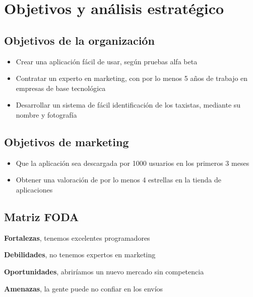\chapter{Objetivos y análisis estratégico}

\section{Objetivos de la organización}

\begin{itemize}
\item Crear una aplicación fácil de usar, según pruebas alfa beta
\item Contratar un experto en marketing, con por lo menos 5 años de trabajo en empresas de base tecnológica
\item Desarrollar un sistema de fácil identificación de los taxistas, mediante su nombre y fotografía
\end{itemize}

\section{Objetivos de marketing}

\begin{itemize}
\item Que la aplicación sea descargada por 1000 usuarios en los primeros 3 meses
\item Obtener una valoración de por lo menos 4 estrellas en la tienda de aplicaciones
\end{itemize}

\section{Matriz FODA}

\textbf{Fortalezas}, tenemos excelentes programadores

\textbf{Debilidades}, no tenemos expertos en marketing

\textbf{Oportunidades}, abriríamos un nuevo mercado sin competencia

\textbf{Amenazas}, la gente puede no confiar en los envíos



